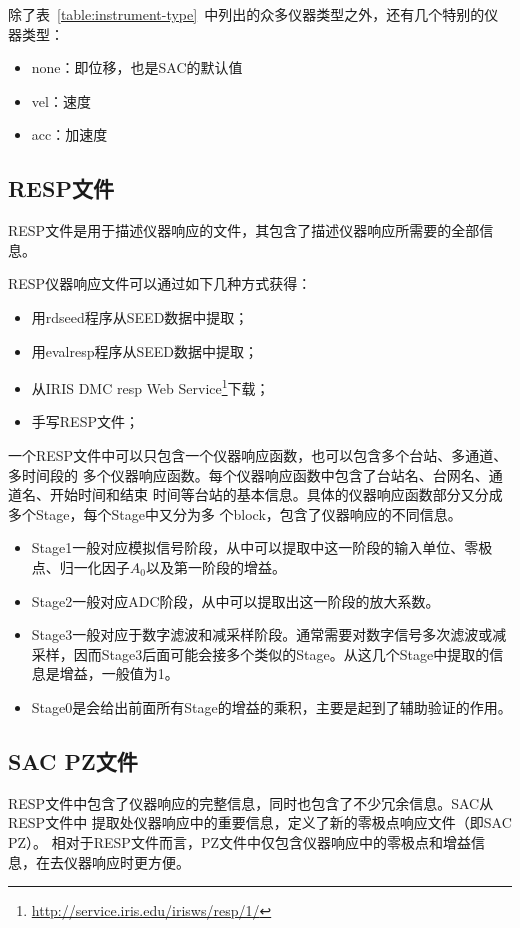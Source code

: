 除了表~\ref{table:instrument-type}~中列出的众多仪器类型之外，还有几个特别的仪器类型：
\begin{itemize}
\item none：即位移，也是SAC的默认值
\item vel：速度
\item acc：加速度
\end{itemize}

\subsection{RESP文件}
RESP文件是用于描述仪器响应的文件，其包含了描述仪器响应所需要的全部信息。

RESP仪器响应文件可以通过如下几种方式获得：
\begin{itemize}
\item 用rdseed程序从SEED数据中提取；
\item 用evalresp程序从SEED数据中提取；
\item 从IRIS DMC resp Web Service\footnote{\url{http://service.iris.edu/irisws/resp/1/}}下载；
\item 手写RESP文件；
\end{itemize}

一个RESP文件中可以只包含一个仪器响应函数，也可以包含多个台站、多通道、多时间段的
多个仪器响应函数。每个仪器响应函数中包含了台站名、台网名、通道名、开始时间和结束
时间等台站的基本信息。具体的仪器响应函数部分又分成多个Stage，每个Stage中又分为多
个block，包含了仪器响应的不同信息。

\begin{itemize}
\item Stage1一般对应模拟信号阶段，从中可以提取中这一阶段的输入单位、零极点、归一化因子$A_0$以及第一阶段的增益。
\item Stage2一般对应ADC阶段，从中可以提取出这一阶段的放大系数。
\item Stage3一般对应于数字滤波和减采样阶段。通常需要对数字信号多次滤波或减采样，因而Stage3后面可能会接多个类似的Stage。从这几个Stage中提取的信息是增益，一般值为1。
\item Stage0是会给出前面所有Stage的增益的乘积，主要是起到了辅助验证的作用。
\end{itemize}

\subsection{SAC PZ文件}
RESP文件中包含了仪器响应的完整信息，同时也包含了不少冗余信息。SAC从RESP文件中
提取处仪器响应中的重要信息，定义了新的零极点响应文件（即SAC PZ）。
相对于RESP文件而言，PZ文件中仅包含仪器响应中的零极点和增益信息，在去仪器响应时更方便。

